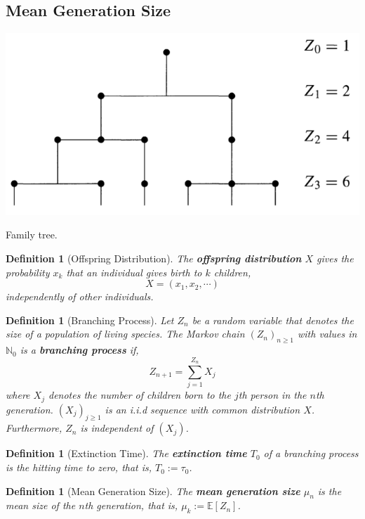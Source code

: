 \documentclass{tufte-handout}
\newtheorem{defn}[thm]{Definition}
\begin{document}
  \subsection{Mean Generation Size}
  \begin{marginfigure}
    \begin{center}
    \includegraphics[width=\textwidth]{fig-15.png}
      \caption{Family tree.}
      \end{center}
  \end{marginfigure}

  \begin{defn}[Offspring Distribution]
    The \textbf{offspring distribution} $X$ gives the probability $x_k$ that an individual gives birth to $k$ children,
    \[X = (x_1, x_2, \cdots)\]
    \noindent independently of other individuals.
  \end{defn}

  \begin{defn}[Branching Process]
    Let $Z_n$ be a random variable that denotes the size of a population of living species. The Markov chain $(Z_n)_{n \geq 1}$ with values in $\mathbb{N}_0$ is a \textbf{branching process} if,
    \[Z_{n+1} = \sum_{j=1}^{Z_n} X_j\]
    \noindent where $X_j$ denotes the number of children born to the $j$th person in the $n$th generation. $(X_j)_{j \geq 1}$ is an i.i.d sequence with common distribution $X$. Furthermore, $Z_n$ is independent of $(X_j)$.
  \end{defn}

  \begin{defn}[Extinction Time]
    The \textbf{extinction time} $T_0$ of a branching process is the hitting time to zero, that is, $T_0 := \tau_0$.
  \end{defn}

  \begin{defn}[Mean Generation Size]
    The \textbf{mean generation size} $\mu_n$ is the mean size of the $n$th generation, that is, $\mu_k := \mathbb{E}[Z_n]$.
  \end{defn}
\end{document}
